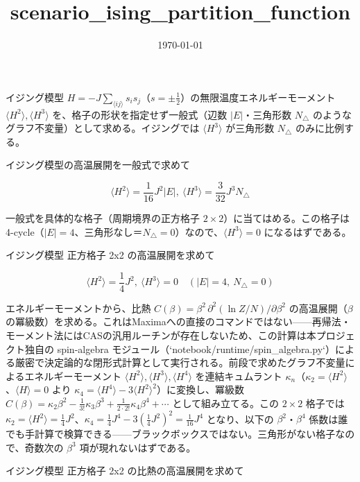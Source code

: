 \documentclass[dvipdfmx,a4paper,11pt]{jsarticle}
\title{scenario\_ising\_partition\_function}
\date{\today}
\begin{document}
\maketitle

イジング模型 $H=-J\sum_{\langle ij\rangle}s_is_j$（$s=\pm\frac12$）の無限温度エネルギーモーメント $\langle H^2\rangle,\langle H^3\rangle$ を、格子の形状を指定せず一般式（辺数 $|E|$・三角形数 $N_\triangle$ のようなグラフ不変量）として求める。イジングでは $\langle H^3\rangle$ が三角形数 $N_\triangle$ のみに比例する。

イジング模型の高温展開を一般式で求めて

\begin{equation}
  \langle H^2 \rangle = \frac{1}{16} J^{2} |E|,\ \langle H^3 \rangle = \frac{3}{32} J^{3} N_\triangle
  \label{eq:E1}
\end{equation}

一般式を具体的な格子（周期境界の正方格子 $2\times2$）に当てはめる。この格子は4-cycle（$|E|=4$、三角形なし＝$N_\triangle=0$）なので、$\langle H^3\rangle=0$ になるはずである。

イジング模型 正方格子 2x2 の高温展開を求めて

\begin{equation}
  \langle H^2 \rangle = \frac{1}{4} J^{2},\ \langle H^3 \rangle = 0 \quad (|E| = 4,\ N_\triangle = 0)
  \label{eq:E2}
\end{equation}

エネルギーモーメントから、比熱 $C(\beta)=\beta^2\,\partial^2(\ln Z/N)/\partial\beta^2$ の高温展開（$\beta$ の冪級数）を求める。これはMaximaへの直接のコマンドではない——再帰法・モーメント法にはCASの汎用ルーチンが存在しないため、この計算は本プロジェクト独自の spin-algebra モジュール（`notebook/runtime/spin\_algebra.py`）による厳密で決定論的な閉形式計算として実行される。前段で求めたグラフ不変量によるエネルギーモーメント $\langle H^2\rangle,\langle H^3\rangle,\langle H^4\rangle$ を連結キュムラント $\kappa_n$（$\kappa_2=\langle H^2\rangle$、$\langle H\rangle=0$ より $\kappa_4=\langle H^4\rangle-3\langle H^2\rangle^2$）に変換し、冪級数 $C(\beta)=\kappa_2\beta^2-\tfrac1{3!}\kappa_3\beta^3+\tfrac1{2\cdot2!}\kappa_4\beta^4+\cdots$ として組み立てる。この $2\times2$ 格子では $\kappa_2=\langle H^2\rangle=\tfrac14J^2$、$\kappa_4=\tfrac14J^4-3(\tfrac14J^2)^2=\tfrac1{16}J^4$ となり、以下の $\beta^2$・$\beta^4$ 係数は誰でも手計算で検算できる——ブラックボックスではない。三角形がない格子なので、奇数次の $\beta^3$ 項が現れないはずである。

イジング模型 正方格子 2x2 の比熱の高温展開を求めて
\end{document}
